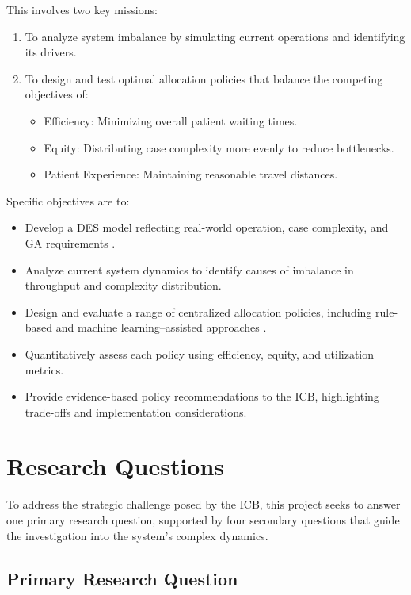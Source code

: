 \documentclass[ %
                    author={Nattanan Nawakitbamrung},
                supervisor={Dr. Sébastien Rochat},
                    degree={MSc},
                     title={Developing and Evaluating the Impact of a Single Patient Treatment List (PTL) for an NHS Integrated Care System},
                  subtitle={},
                      type={},
                      year={2025}]{dissertation}
\begin{document}
\vspace{0.5cm}
\noindent
This involves two key missions:
\begin{enumerate}
    \item To analyze system imbalance by simulating current operations and identifying its drivers.
    \item To design and test optimal allocation policies that balance the competing objectives of:
    \begin{itemize}
        \item Efficiency: Minimizing overall patient waiting times.
        \item Equity: Distributing case complexity more evenly to reduce bottlenecks.
        \item Patient Experience: Maintaining reasonable travel distances.
    \end{itemize}
\end{enumerate}

\vspace{1cm}
\noindent
Specific objectives are to:
\begin{itemize}
    \item Develop a DES model reflecting real-world operation, case complexity, and GA requirements \cite{simpy_docs}.
    \item Analyze current system dynamics to identify causes of imbalance in throughput and complexity distribution.
    \item Design and evaluate a range of centralized allocation policies, including rule-based and machine learning–assisted approaches \cite{scikit_learn_api}.
    \item Quantitatively assess each policy using efficiency, equity, and utilization metrics.
    \item Provide evidence-based policy recommendations to the ICB, highlighting trade-offs and implementation considerations.
\end{itemize}

\noindent
\section{Research Questions}

To address the strategic challenge posed by the ICB, this project seeks to answer one primary research question, supported by four secondary questions that guide the investigation into the system's complex dynamics.

\noindent
\subsection{Primary Research Question}
\end{document}
